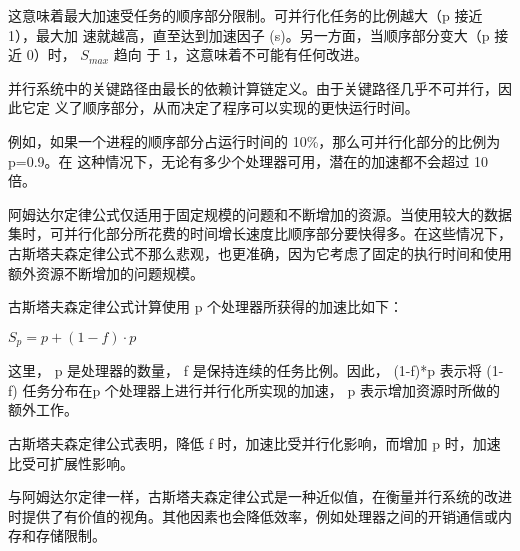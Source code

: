 这意味着最大加速受任务的顺序部分限制。可并行化任务的比例越大（p 接近 1），最大加
速就越高，直至达到加速因子 (s)。另一方面，当顺序部分变大（p 接近 0）时， $S_{max}$ 趋向
于 1，这意味着不可能有任何改进。



并行系统中的关键路径由最长的依赖计算链定义。由于关键路径几乎不可并行，因此它定
义了顺序部分，从而决定了程序可以实现的更快运行时间。

例如，如果一个进程的顺序部分占运行时间的 10\%，那么可并行化部分的比例为 p=0.9。在
这种情况下，无论有多少个处理器可用，潜在的加速都不会超过 10 倍。


阿姆达尔定律公式仅适用于固定规模的问题和不断增加的资源。当使用较大的数据集时，可并行化部分所花费的时间增长速度比顺序部分要快得多。在这些情况下，古斯塔夫森定律公式不那么悲观，也更准确，因为它考虑了固定的执行时间和使用额外资源不断增加的问题规模。

古斯塔夫森定律公式计算使用 p 个处理器所获得的加速比如下：

\begin{center}
$S_p = p + (1 - f) · p$
\end{center}

这里， p 是处理器的数量， f 是保持连续的任务比例。因此， (1-f)*p 表示将 (1-f) 任务分布在p 个处理器上进行并行化所实现的加速， p 表示增加资源时所做的额外工作。

古斯塔夫森定律公式表明，降低 f 时，加速比受并行化影响，而增加 p 时，加速比受可扩展性影响。

与阿姆达尔定律一样，古斯塔夫森定律公式是一种近似值，在衡量并行系统的改进时提供了有价值的视角。其他因素也会降低效率，例如处理器之间的开销通信或内存和存储限制。




































